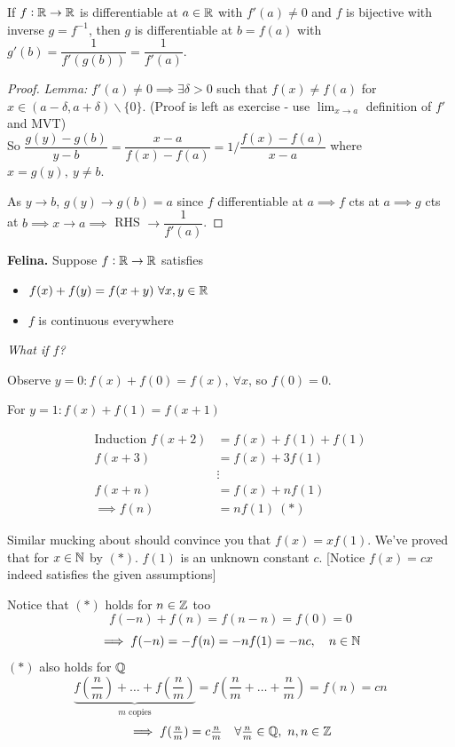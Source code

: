 \begin{theorem}
	If $f:\mathbb{R} \to \mathbb{R}$ is differentiable at $a\in \mathbb{R}$ with $f'(a) \neq 0$ and $f$ is bijective with inverse $g = f^{-1}$, then $g$ is differentiable at $b = f(a)$ with $g'(b) = \dfrac{1}{f'(g(b))} = \dfrac{1}{f'(a)}.$
\end{theorem}
\begin{proof}
\textit{Lemma:} $f'(a) \neq 0 \implies \exists \delta > 0$ such that $f(x) \neq f(a)$ for $x \in (a-\delta,a + \delta)\backslash\{0\}$.  (Proof is left as exercise - use $\lim_{x\to a}$ definition of $f'$ and MVT) \\

 So $\dfrac{g(y)-g(b)}{y-b} = \dfrac{x-a}{f(x) - f(a)} = 1/\dfrac{f(x)-f(a)}{x-a}$ where $x = g(y),~y \neq b$.
 
 As $y \to b$, $g(y) \to g(b) = a$ since $f$ differentiable at $a \implies f$ cts at $a \implies g$ cts at $b \implies x \to a \implies$ RHS $\to \dfrac{1}{f'(a)}$.	
\end{proof}\vspace*{15pt}



\textbf{Felina.} Suppose $f: \mathbb{R} \to \mathbb{R}$ satisfies
\begin{itemize}
\item $f(x) + f(y) = f(x+y)~\forall x,y\in\mathbb{R}$
\item $f$ is continuous everywhere	
\end{itemize}

\emph{What if $f$?}

Observe $y = 0: f(x) + f(0) = f(x),~\forall x$, so $f(0) = 0$. 

For $y = 1: f(x) + f(1) = f(x+1)$

\[\begin{aligned}\text{Induction } f(x+2) &= f(x) + f(1) + f(1) \\
f(x+3) &= f(x) + 3f(1)\\
&\vdots \\ 
 f(x+n) &= f(x) + nf(1)\\
\implies f(n) &= nf(1) ~(*)\end{aligned}
\]

Similar mucking about should convince you that $f(x) = xf(1)$. We've proved that for $x\in\mathbb{N}$ by $(*)$. $f(1)$ is an unknown constant $c$. [Notice $f(x) = cx$ indeed satisfies the given assumptions]

Notice  that $(*)$ holds for $n \in\mathbb{Z}$ too
\[f(-n) + f(n) = f(n-n) = f(0) = 0\]
\[\implies f(-n) = -f(n) = -nf(1) = -nc,\quad n \in\mathbb{N}\]
$(*)$ also holds for $\mathbb{Q}$
\[\textstyle{\underbrace{\textstyle{f(\frac{n}{m}) + \dots + f(\frac{n}{m})}}_{m \text{ copies}} = f(\frac{n}{m} + \dots + \frac{n}{m}) =f(n) = cn}\]
\[\textstyle{\implies f(\frac{n}{m}) = c\frac{n}{m} \quad \forall \frac{n}{m} \in\mathbb{Q},~n,n\in\mathbb{Z}}\]

